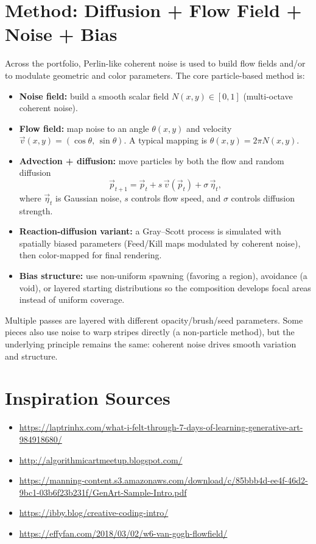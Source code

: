\documentclass[12pt]{article}
\begin{document}
\section{Method: Diffusion + Flow Field + Noise + Bias}
Across the portfolio, Perlin-like coherent noise is used to build flow fields and/or to modulate geometric and
color parameters. The core particle-based method is:

\begin{itemize}[leftmargin=*,itemsep=3pt]
	\item \textbf{Noise field:} build a smooth scalar field $N(x,y) \in [0,1]$ (multi-octave coherent noise).
	\item \textbf{Flow field:} map noise to an angle $\theta(x,y)$ and velocity
		$\vec{v}(x,y) = (\cos\theta,\,\sin\theta)$. A typical mapping is $\theta(x,y)=2\pi N(x,y)$.
	\item \textbf{Advection + diffusion:} move particles by both the flow and random diffusion
		\[
		\vec{p}_{t+1} = \vec{p}_t + s\,\vec{v}(\vec{p}_t) + \sigma\,\vec{\eta}_t,
		\]
		where $\vec{\eta}_t$ is Gaussian noise, $s$ controls flow speed, and $\sigma$ controls diffusion strength.
	\item \textbf{Reaction-diffusion variant:} a Gray--Scott process is simulated with spatially biased parameters
		(Feed/Kill maps modulated by coherent noise), then color-mapped for final rendering.
	\item \textbf{Bias structure:} use non-uniform spawning (favoring a region), avoidance (a void), or layered
		starting distributions so the composition develops focal areas instead of uniform coverage.
\end{itemize}

Multiple passes are layered with different opacity/brush/seed parameters. Some pieces also use noise to warp
stripes directly (a non-particle method), but the underlying principle remains the same: coherent noise drives
smooth variation and structure.

\section{Inspiration Sources}
\small
\begin{itemize}[leftmargin=*,itemsep=2pt]
	\item \url{https://laptrinhx.com/what-i-felt-through-7-days-of-learning-generative-art-984918680/}
	\item \url{http://algorithmicartmeetup.blogspot.com/}
	\item \url{https://manning-content.s3.amazonaws.com/download/c/85bbb4d-ee4f-46d2-9bc1-03b6f23b231f/GenArt-Sample-Intro.pdf}
	\item \url{https://ibby.blog/creative-coding-intro/}
	\item \url{https://effyfan.com/2018/03/02/w6-van-gogh-flowfield/}
\end{itemize}
\normalsize
\end{document}
